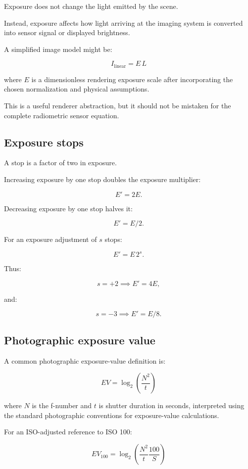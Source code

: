 Exposure does not change the light emitted by the scene.

Instead, exposure affects how light arriving at the imaging system is converted into sensor signal or displayed brightness.

A simplified image model might be:

\[ \boxed{ I_{\mathrm{linear}}=E\,L } \]

where \(E\) is a dimensionless rendering exposure scale after incorporating the chosen normalization and physical assumptions.

This is a useful renderer abstraction, but it should not be mistaken for the complete radiometric sensor equation.

\subsection{Exposure stops}\label{02-foundations-ii-ch036-exposure-stops}

A stop is a factor of two in exposure.

Increasing exposure by one stop doubles the exposure multiplier:

\[ \boxed{E'=2E}. \]

Decreasing exposure by one stop halves it:

\[ \boxed{E'=E/2}. \]

For an exposure adjustment of \(s\) stops:

\[ \boxed{ E'=E\,2^s. } \]

Thus:

\[ s=+2\implies E'=4E, \]

and:

\[ s=-3\implies E'=E/8. \]

\subsection{Photographic exposure value}\label{02-foundations-ii-ch036-photographic-exposure-value}

A common photographic exposure-value definition is:

\[ \boxed{ EV=\log_2\left(\frac{N^2}{t}\right) } \]

where \(N\) is the f-number and \(t\) is shutter duration in seconds, interpreted using the standard photographic conventions for exposure-value calculations.

For an ISO-adjusted reference to ISO 100:

\[ \boxed{ EV_{100} = \log_2\left( \frac{N^2}{t}\frac{100}{S} \right) } \]

